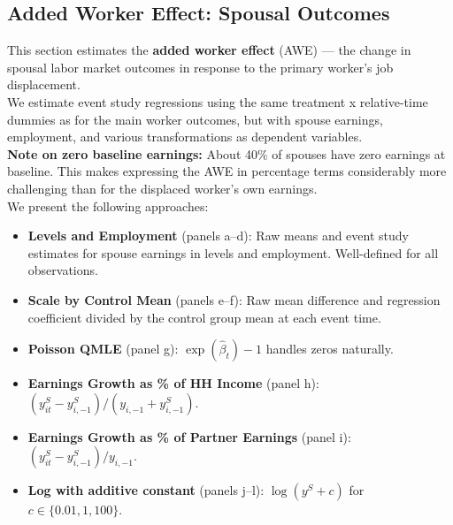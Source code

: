 \documentclass{article}
\begin{document}
\begin{itemize}
\section{Added Worker Effect: Spousal Outcomes}
This section estimates the \textbf{added worker effect} (AWE) --- the change in spousal labor market outcomes
in response to the primary worker's job displacement.
\\ We estimate event study regressions using the same treatment x relative-time dummies
as for the main worker outcomes, but with spouse earnings, employment, and various transformations as dependent variables.
\\
\textbf{Note on zero baseline earnings:} About 40\% of spouses have zero earnings at baseline.
This makes expressing the AWE in percentage terms considerably more challenging than for the
displaced worker's own earnings.
\\
We present the following approaches:
\begin{itemize}
\item \textbf{Levels and Employment} (panels a--d): Raw means and event study estimates for
spouse earnings in levels and employment. Well-defined for all observations.
\item \textbf{Scale by Control Mean} (panels e--f): Raw mean difference and regression coefficient
divided by the control group mean at each event time.
\item \textbf{Poisson QMLE} (panel g): $ \exp(\hat{\beta}_t) - 1$ handles zeros naturally.
\item \textbf{Earnings Growth as \% of HH Income} (panel h): $ (y_{it}^S - y_{i,-1}^S) / (y_{i,-1} + y_{i,-1}^S)$.
\item \textbf{Earnings Growth as \% of Partner Earnings} (panel i): $ (y_{it}^S - y_{i,-1}^S) / y_{i,-1}$.
\item \textbf{Log with additive constant} (panels j--l): $ \log(y^S + c)$ for $ c \in \{0.01, 1, 100\}$.
\end{itemize}

\end{itemize}
\end{document}
